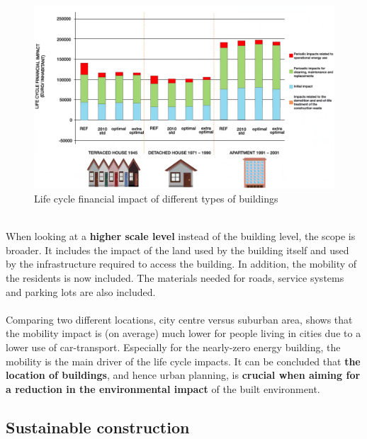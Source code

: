 \documentclass[../summary.tex]{subfiles}
\begin{document}
	
	\begin{figure}[H]
		\centering
		\includegraphics[width=0.9\linewidth]{../images/8-life-cycle-financial-impact}
		\caption{Life cycle financial impact of different types of buildings}
		\label{fig:8-life-cycle-financial-impact}
	\end{figure}
	\ \\
	When looking at a \textbf{higher scale level} instead of the building level, the scope is broader. It includes the impact of the land used by the building itself and used by the infrastructure required to access the building. In addition, the mobility of the residents is now included. The materials needed for roads, service systems and parking lots are also included.\\
	\\
	Comparing two different locations, city centre versus suburban area, shows that the mobility impact is (on average) much lower for people living in cities due to a lower use of car-transport. Especially for the nearly-zero energy building, the mobility is the main driver of the life cycle impacts. It can be concluded that \textbf{the location of buildings}, and hence urban planning, is \textbf{crucial when aiming for a reduction in the environmental impact} of the built environment.
	
	\subsection{Sustainable construction}
	
\end{document}

